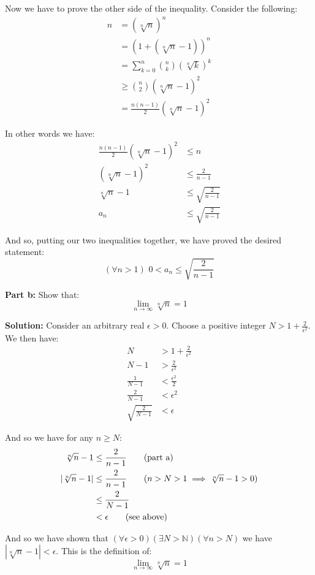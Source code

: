\documentclass{article}
\newcommand{\N}{\mathbb N}
\begin{document}
Now we have to prove the other side of the inequality. Consider the following:
\begin{align*}
  n&=\left(\sqrt[n]{n}\right)^n\\
  &=(1+(\sqrt[n]{n}-1))^n\\
  &=\sum_{k=0}^n\binom{n}{k}(\sqrt[n]{k})^k\tag{binomial theorem}\\
  &\ge\binom{n}{2}(\sqrt[n]{n}-1)^2\tag{second term only, $n>1$}\\
  &=\frac{n(n-1)}{2}(\sqrt[n]{n}-1)^2
\end{align*}

In other words we have:
\begin{align*}
  \frac{n(n-1)}{2}(\sqrt[n]{n}-1)^2&\le n\tag{see above}\\
  (\sqrt[n]{n}-1)^2&\le\frac{2}{n-1}\\
  \sqrt[n]{n}-1&\le\sqrt{\frac{2}{n-1}}\\
  a_n&\le\sqrt{\frac{2}{n-1}}\tag{def. of $a_n$}
\end{align*}

And so, putting our two inequalities together, we have proved the desired statement:
\begin{equation*}
  (\forall n>1)\,\,0<a_n\le\sqrt{\frac{2}{n-1}}
\end{equation*}

\noindent\textbf{Part b:} Show that:
$$\lim_{n\to\infty}\sqrt[n]{n}=1$$

\noindent\textbf{Solution:} Consider an arbitrary real $\epsilon>0$. Choose a positive integer $N>1+\frac{2}{\epsilon^2}$. We then have:
\begin{align*}
  N&>1+\frac{2}{\epsilon^2}\tag{$N$ exists by archemdiean property}\\
  N-1&>\frac{2}{\epsilon^2}\\
  \frac{1}{N-1}&<\frac{\epsilon^2}{2}\\
  \frac{2}{N-1}&<\epsilon^2\\
  \sqrt{\frac{2}{N-1}}&<\epsilon
\end{align*}

And so we have for any $n\ge N$:
\begin{align*}
  \sqrt[n]{n}-1&\le\frac{2}{n-1}\tag{part a}\\
  |\sqrt[n]{n}-1|&\le\frac{2}{n-1}\tag{$n>N>1\implies\sqrt[n]{n}-1>0$}\\
  &\le\frac{2}{N-1}\\
  &<\epsilon\tag{see above}
\end{align*}

And so we have shown that $(\forall\epsilon>0)(\exists N>\N)(\forall n>N)$ we have $|\sqrt[n]{n}-1|<\epsilon$. This is the definition of:
\begin{equation*}
  \lim_{n\to\infty}\sqrt[n]{n}=1
\end{equation*}


\end{document}

